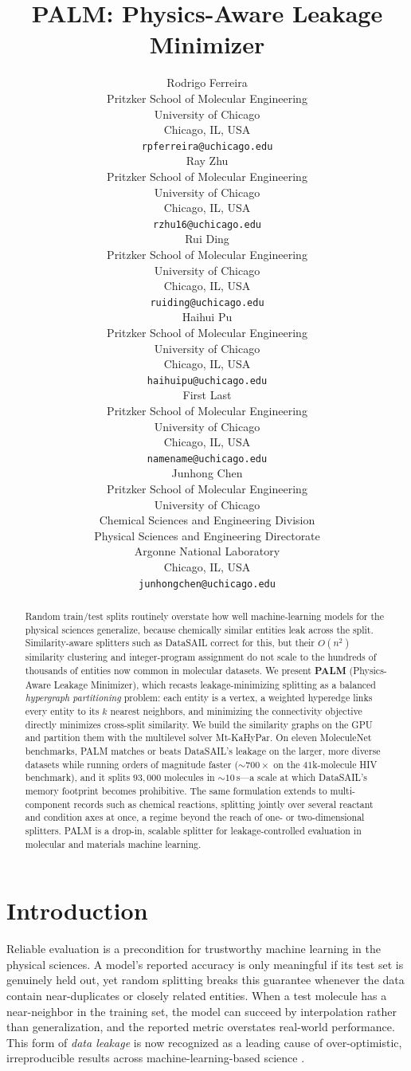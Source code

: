 \documentclass{article}
\title{PALM: Physics-Aware Leakage Minimizer}
\author{%
  Rodrigo Ferreira\\
  Pritzker School of Molecular Engineering\\
  University of Chicago\\
  Chicago, IL, USA \\
  \texttt{rpferreira@uchicago.edu} \\
  \And
  Ray Zhu\\
  Pritzker School of Molecular Engineering\\
  University of Chicago\\
  Chicago, IL, USA \\
  \texttt{rzhu16@uchicago.edu} \\
  \And
  Rui Ding\\
  Pritzker School of Molecular Engineering\\
  University of Chicago\\
  Chicago, IL, USA \\
  \texttt{ruiding@uchicago.edu} \\
  \And
  Haihui Pu\\
  Pritzker School of Molecular Engineering\\
  University of Chicago\\
  Chicago, IL, USA \\
  \texttt{haihuipu@uchicago.edu} \\
  \And
  First Last\\
  Pritzker School of Molecular Engineering\\
  University of Chicago\\
  Chicago, IL, USA \\
  \texttt{namename@uchicago.edu} \\
  \And
  Junhong Chen\\
  Pritzker School of Molecular Engineering\\
  University of Chicago\\
  Chemical Sciences and Engineering Division \\
  Physical Sciences and Engineering Directorate \\
  Argonne National Laboratory\\
  Chicago, IL, USA \\
  \texttt{junhongchen@uchicago.edu} \\
}
\begin{document}
\maketitle

\begin{abstract}
Random train/test splits routinely overstate how well machine-learning
models for the physical sciences generalize, because chemically similar
entities leak across the split. Similarity-aware splitters such as DataSAIL
correct for this, but their $O(n^2)$ similarity clustering and integer-program
assignment do not scale to the hundreds of thousands of entities now common in
molecular datasets. We present \textbf{PALM} (Physics-Aware Leakage Minimizer),
which recasts leakage-minimizing splitting as a balanced \emph{hypergraph
partitioning} problem: each entity is a vertex, a weighted hyperedge links every
entity to its $k$ nearest neighbors, and minimizing the connectivity
objective directly minimizes cross-split similarity. We build the similarity
graphs on the GPU and partition them with the multilevel solver Mt-KaHyPar. On eleven
MoleculeNet benchmarks, PALM matches or beats DataSAIL's leakage on the larger,
more diverse datasets while running orders of magnitude faster
($\sim$$700\times$ on the $41$k-molecule HIV benchmark), and it splits
$93{,}000$ molecules in $\sim$$10$\,s---a scale at which DataSAIL's memory
footprint becomes prohibitive. The same
formulation extends to multi-component records such as chemical reactions,
splitting jointly over several reactant and condition axes at once, a regime
beyond the reach of one- or two-dimensional splitters. PALM is a drop-in,
scalable splitter for leakage-controlled evaluation in molecular and materials
machine learning.
\end{abstract}

\section{Introduction}
\label{intro}
Reliable evaluation is a precondition for trustworthy machine learning in the
physical sciences. A model's reported accuracy is only meaningful if its test
set is genuinely held out, yet random splitting breaks this guarantee whenever
the data contain near-duplicates or closely related entities. When a test
molecule has a near-neighbor in the training set, the model can succeed by
interpolation rather than generalization, and the reported metric overstates
real-world performance. This form of \emph{data leakage} is now recognized as a
leading cause of over-optimistic, irreproducible results across
machine-learning-based science \cite{kapoor2023leakage}.
\end{document}
